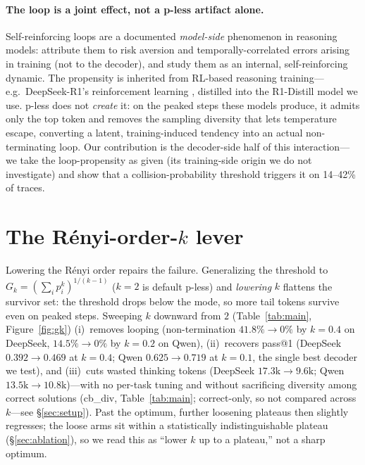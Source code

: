 \documentclass[11pt]{article}                       %
\newcommand{\tsum}{\ensuremath{\textstyle\sum}}
\begin{document}
\paragraph{The loop is a joint effect, not a p-less artifact alone.} Self-reinforcing loops are a
documented \emph{model-side} phenomenon in reasoning models: \citet{pipis2025loop} attribute them to
risk aversion and temporally-correlated errors arising in training (not to the decoder), and
\citet{duan2026circular} study them as an internal, self-reinforcing dynamic. The propensity is
inherited from RL-based reasoning training---e.g.\ DeepSeek-R1's reinforcement learning
\citep{deepseekai2025r1}, distilled into the R1-Distill model we use. p-less does not \emph{create} it:
on the peaked steps these models produce, it admits only the top token and removes the sampling
diversity that lets temperature escape, converting a latent, training-induced tendency into an actual
non-terminating loop. Our contribution is the decoder-side half of this interaction---we take the
loop-propensity as given (its training-side origin we do not investigate) and show that a
collision-probability threshold triggers it on 14--42\% of traces.

\section{The \texorpdfstring{R\'enyi-order-$k$}{Renyi-order-k} lever}\label{sec:alpha}
Lowering the R\'enyi order repairs the failure. Generalizing the threshold to
$G_k=(\tsum_i p_i^k)^{1/(k-1)}$ ($k{=}2$ is default p-less) and \emph{lowering} $k$ flattens the
survivor set: the threshold drops below the mode, so more tail tokens survive even on peaked steps.
Sweeping $k$ downward from $2$ (Table~\ref{tab:main}, Figure~\ref{fig:gk}) (i)~removes looping
(non-termination $41.8\%\!\to\!0\%$ by $k{=}0.4$ on DeepSeek, $14.5\%\!\to\!0\%$ by $k{=}0.2$ on Qwen),
(ii)~recovers pass@1 (DeepSeek $0.392\!\to\!0.469$ at $k{=}0.4$; Qwen $0.625\!\to\!0.719$ at $k{=}0.1$,
the single best decoder we test), and (iii)~cuts wasted thinking tokens (DeepSeek
$17.3\text{k}\!\to\!9.6\text{k}$; Qwen $13.5\text{k}\!\to\!10.8\text{k}$)---with no per-task tuning and
without sacrificing diversity among correct solutions (cb\_div, Table~\ref{tab:main}; correct-only, so
not compared across $k$---see \S\ref{sec:setup}). Past the optimum, further loosening plateaus then
slightly regresses; the loose arms sit within a statistically indistinguishable plateau
(\S\ref{sec:ablation}), so we read this as ``lower $k$ up to a plateau,'' not a sharp optimum.
\end{document}

